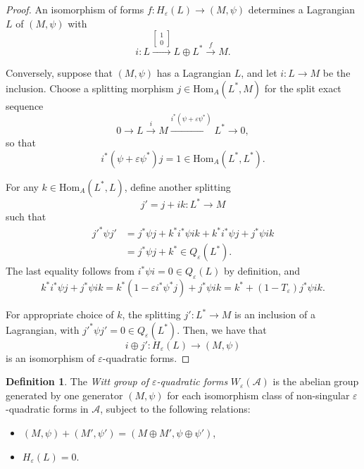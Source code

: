 \documentclass{article}
\theoremstyle{definition}
\newtheorem{defn}[theorem]{Definition}
\begin{document}
\begin{proof}
 An isomorphism of forms \( f : H_\varepsilon(L) \to (M, \psi) \) determines a Lagrangian \( L \) of \( (M, \psi) \) with
\[
i : L \xrightarrow{\left[ \begin{smallmatrix} 1 \\ 0 \end{smallmatrix} \right]} L \oplus L^* \xrightarrow{f} M.
\]

Conversely, suppose that \( (M, \psi) \) has a Lagrangian \( L \), and let \( i : L \to M \) be the inclusion. Choose a splitting morphism \( j \in \mathrm{Hom}_A(L^*, M) \) for the split exact sequence
\[
0 \to L \xrightarrow{i} M \xrightarrow{i^*(\psi + \varepsilon \psi^*)} L^* \to 0,
\]
so that
\[
i^*(\psi + \varepsilon \psi^*)j = 1 \in \mathrm{Hom}_A(L^*, L^*).
\]

For any \( k \in \mathrm{Hom}_A(L^*, L) \), define another splitting
\[
j' = j + ik : L^* \to M
\]
such that
\[
\begin{aligned}
j'^* \psi j' &= j^* \psi j + k^* i^* \psi i k + k^* i^* \psi j + j^* \psi i k \\
             &= j^* \psi j + k^* \in Q_\varepsilon(L^*).
\end{aligned}
\]
The last equality follows from $i^*\psi i=0 \in Q_\varepsilon(L)$ by definition, and
$$k^*i^*\psi j +j^*\psi ik=k^*(1-\varepsilon i^*\psi^*j) +j^*\psi ik=k^* +(1-T_\varepsilon) j^*\psi ik.$$

For appropriate choice of $k$, the splitting \( j' : L^* \to M \)  is an inclusion of a Lagrangian, with
$j'^* \psi j' = 0 \in Q_\varepsilon(L^*).$ Then, we have that
\[
i \oplus j' : H_\varepsilon(L) \to (M, \psi)
\]
is an isomorphism of \( \varepsilon \)-quadratic forms. 
\end{proof}

\begin{defn}
    
The \emph{Witt group of \( \varepsilon \)-quadratic forms} \( W_\varepsilon(\mathcal{A}) \) is the abelian group generated by one generator \( (M, \psi) \) for each isomorphism class of non-singular \( \varepsilon \)-quadratic forms in \( \mathcal{A} \), subject to the following relations:

\begin{itemize}
  \item[(i)] \( (M, \psi) + (M', \psi') = (M \oplus M', \psi \oplus \psi') \),
  \item[(ii)] \( H_\varepsilon(L) = 0 \).
\end{itemize}
\end{defn} 
\end{document}
